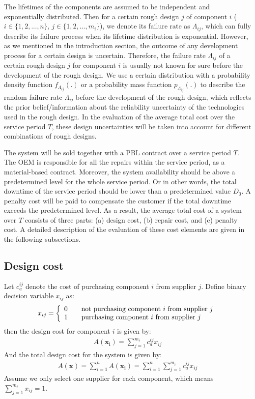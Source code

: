 \documentclass[preprint,12pt]{elsarticle}
\begin{document}
The lifetimes of the components are assumed to be independent and exponentially distributed. Then for a certain rough design $j$ of component $i$ ($i \in \{1,2,...,n\}$, $j \in \{1,2,...,m_i\}$), we denote its failure rate as $\Lambda_{ij}$, which can fully describe its failure process when its lifetime distribution is exponential. However, as we mentioned in the introduction section, the outcome of any development process for a certain design is uncertain. Therefore, the failure rate $\Lambda_{ij}$ of a certain rough design $j$ for component $i$ is usually not known for sure before the development of the rough design. We use a certain distribution with a probability density function $f_{\Lambda_{ij}}(.)$ or a probability mass function $p_{\Lambda_{ij}}(.)$ to describe the random failure rate $\Lambda_{ij}$ before the development of the rough design, which reflects the prior belief/information about the reliability uncertainty of the technologies used in the rough design. In the evaluation of the average total cost over the service period $T$, these design uncertainties will be taken into account for different combinations of rough designs.

The system will be sold together with a PBL contract over a service period $T$. The OEM is responsible for all the repairs within the service period, as a material-based contract. Moreover, the system availability should be above a predetermined level for the whole service period. Or in other words, the total downtime of the service period should be lower than a predetermined value $D_0$. A penalty cost will be paid to compensate the customer if the total downtime exceeds the predetermined level. As a result, the average total cost of a system over $T$ consists of three parts: (a) design cost, (b) repair cost, and (c) penalty cost. A detailed description of the evaluation of these cost elements are given in the following subsections.



\subsection{Design cost}
	
	Let $c^{ij}_{a}$ denote the cost of purchasing component $i$ from supplier $j$. Define binary decision variable $x_{ij}$ as:
	\[ x_{ij} = \left \{
	  \begin{array} {l l}
		0 & \quad \text {not purchasing component $i$ from supplier $j$} \\
		1 & \quad \text {purchasing component $i$ from supplier $j$}
		\end {array} \right.\]
		then the design cost for component $i$ is given by:
	 \begin{eqnarray}
	A(\boldsymbol{x_{i}})=\sum^{m_{i}}_{j=1} {c^{ij}_{a} x_{ij}}
		 \end{eqnarray}
And the total design cost for the system is given by:
\begin{eqnarray}
	A(\boldsymbol{x})=\sum ^{n}_{i=1}A(\boldsymbol{x_{i}})=\sum ^{n}_{i=1}\sum^{m_{i}}_{j=1} {c^{ij}_{a} x_{ij}}
\end{eqnarray}
Assume we only select one supplier for each component, which means $\sum^{m_{i}}_{j=1}{x_{ij}=1}$.	
	
\end{document}
